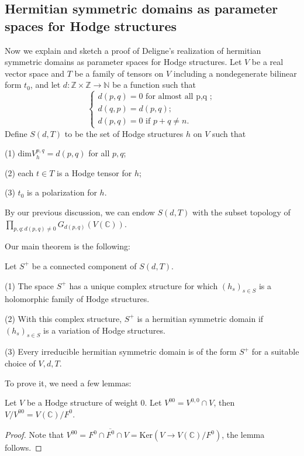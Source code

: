 \subsection{Hermitian symmetric domains as parameter spaces for Hodge structures}
 \label{subsection-Hermitian-for-Hodge}
Now we explain and sketch a proof of Deligne's realization of hermitian symmetric domains as parameter spaces for Hodge structures. Let $V$ be a real vector space and $T$ be a family of tensors on $V$ including a nondegenerate bilinear form $t_0$, and let $d: \mathbb Z \times \mathbb Z \to \mathbb N$ be a function such that 
$$
\begin{cases}
d(p,q)=0 \text{ for almost all p,q };\\ d(q,p)=d(p,q);\\ d(p,q) =0  \text{ if } p+q \ne n.
\end{cases}
$$
Define $S(d,T)$ to be the set of Hodge structures $h$ on $V$ such that 

(1) $\text{dim} V_h^{p,q} =d(p,q)$ for all $p,q$;

(2) each $t\in T$ is a Hodge tensor for $h$;

(3) $t_0$ is a polarization for $h$.

By our previous discussion, we can endow $S(d,T)$ with the subset topology of  $\prod_{p,q:d(p,q)\ne 0} G_{d(p,q)}(V(\mathbb C))$.  

Our main theorem is the following:

\begin{theorem}
 \label{theorem-Hermitian-for-Hodge}
 Let $S^+$ be a connected component of $S(d,T)$.

(1) The space $S^+$ has a unique complex structure for which $(h_s)_{s\in S}$ is a holomorphic family of Hodge structures.

(2) With this complex structure, $S^+$ is a hermitian symmetric domain if $(h_s)_{s\in S}$ is a variation of Hodge structures.

(3) Every irreducible hermitian symmetric domain is of the form $S^+$ for a suitable choice of $V,d, T$.
\end{theorem}

To prove it, we need a few lemmas:

\begin{lemma}
 \label{lemma-1}
 Let $V$ be a Hodge structure of weight 0. Let $V^{00}=V^{0,0} \cap V$, then $V/V^{00}=V(\mathbb C)/ F^0$.
\end{lemma} 

\begin{proof}
Note that $V^{00}=F^0 \cap \overline{F^0} \cap V = \text{Ker} (V \to V(\mathbb C)/F^0)$, the lemma follows. 
\end{proof}


